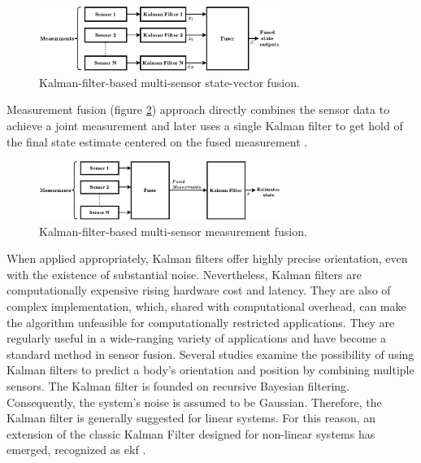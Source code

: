 \begin{figure}[!h]
    \centering
    \includegraphics[width=0.7\textwidth]{figures/kalman1.pdf}
    \caption{Kalman-filter-based multi-sensor state-vector fusion. \cite{mosallaei2007process}}
    \label{fig:state_kalman}
\end{figure}

Measurement fusion (figure \ref{fig:mesearurment_kalman}) approach directly combines the sensor data to achieve a joint measurement and later uses a single Kalman filter to get hold of the final state estimate centered on the fused measurement \cite{mosallaei2007process}.

\begin{figure}[!h]
    \centering
    \includegraphics[width=0.7\textwidth]{figures/kalman2.pdf}
    \caption{Kalman-filter-based multi-sensor measurement fusion. \cite{mosallaei2007process}}
    \label{fig:mesearurment_kalman}
\end{figure}

When applied appropriately, Kalman filters offer highly precise orientation, even with the existence of substantial noise. Nevertheless, Kalman filters are computationally expensive rising hardware cost and latency. They are also of complex implementation, which, shared with computational overhead, can make the algorithm unfeasible for computationally restricted applications. They are regularly useful in a wide-ranging variety of applications and have become a standard method in sensor fusion. Several studies examine the possibility of using Kalman filters to predict a body's orientation and position by combining multiple sensors. The Kalman filter is founded on recursive Bayesian filtering.
Consequently, the system's noise is assumed to be Gaussian. Therefore, the Kalman filter is generally suggested for linear systems. For this reason, an extension of the classic Kalman Filter designed for non-linear systems has emerged, recognized as \acrfull{ekf} \cite{wilson2019formulation}.

